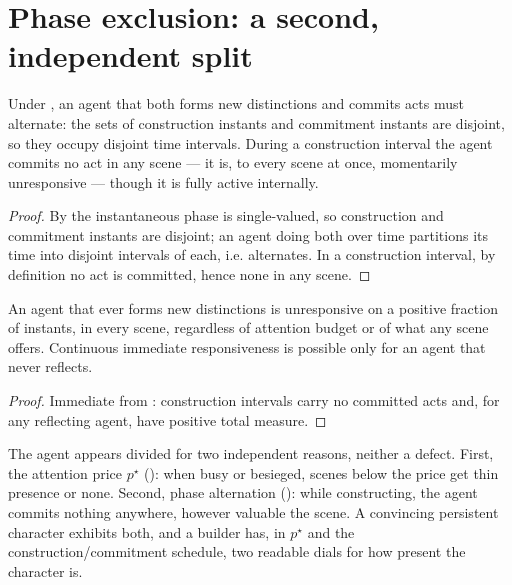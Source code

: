 \documentclass[11pt,twocolumn,a4paper]{article}
\newcommand{\price}{p^{\star}}       %
\begin{document}
\section{Phase exclusion: a second, independent split}
\label{sec:phases}

\begin{theorem}
\label{thm:alternation}
Under , an agent that both forms new distinctions and
commits acts must alternate: the sets of construction instants and
commitment instants are disjoint, so they occupy disjoint time intervals.
During a construction interval the agent commits no act in any scene ---
it is, to every scene at once, momentarily unresponsive --- though it is
fully active internally.
\end{theorem}

\begin{proof}
By  the instantaneous phase is single-valued, so
construction and commitment instants are disjoint; an agent doing both
over time partitions its time into disjoint intervals of each, i.e.
alternates. In a construction interval, by definition no act is committed,
hence none in any scene.
\end{proof}

\begin{corollary}
\label{cor:intermittent}
An agent that ever forms new distinctions is unresponsive on a positive
fraction of instants, in every scene, regardless of attention budget or of
what any scene offers. Continuous immediate responsiveness is possible
only for an agent that never reflects.
\end{corollary}

\begin{proof}
Immediate from : construction intervals carry no
committed acts and, for any reflecting agent, have positive total measure.
\end{proof}

\begin{remark}
\label{rem:two-faces}
The agent appears divided for two independent reasons, neither a defect.
First, the attention price $\price$ (): when busy or
besieged, scenes below the price get thin presence or none. Second, phase
alternation (): while constructing, the agent
commits nothing anywhere, however valuable the scene. A convincing
persistent character exhibits both, and a builder has, in $\price$ and the
construction/commitment schedule, two readable dials for how present the
character is.
\end{remark}
\end{document}
